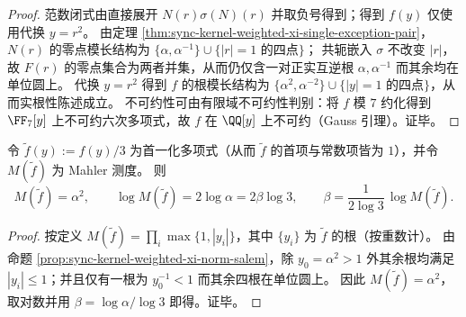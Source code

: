 \begin{proof}
范数闭式由直接展开 \(N(r)\sigma(N)(r)\) 并取负号得到；得到 \(f(y)\) 仅使用代换 \(y=r^2\)。
由定理 \ref{thm:sync-kernel-weighted-xi-single-exception-pair}，\(N(r)\) 的零点模长结构为 \(\{\alpha,\alpha^{-1}\}\cup\{|r|=1\text{ 的四点}\}\)；
共轭嵌入 \(\sigma\) 不改变 \(|r|\)，故 \(F(r)\) 的零点集合为两者并集，从而仍仅含一对正实互逆根 \(\alpha,\alpha^{-1}\) 而其余均在单位圆上。
代换 \(y=r^2\) 得到 \(f\) 的根模长结构为 \(\{\alpha^2,\alpha^{-2}\}\cup\{|y|=1\text{ 的四点}\}\)，从而实根性陈述成立。
不可约性可由有限域不可约性判别：将 \(f\) 模 \(7\) 约化得到 \(\FF_7[y]\) 上不可约六次多项式，故 \(f\) 在 \(\QQ[y]\) 上不可约（Gauss 引理）。证毕。
\end{proof}

\begin{theorem}\label{thm:sync-kernel-weighted-xi-beta-mahler}
令 \(\tilde f(y):=f(y)/3\) 为首一化多项式（从而 \(\tilde f\) 的首项与常数项皆为 \(1\)），并令 \(M(\tilde f)\) 为 Mahler 测度。
则
\[
M(\tilde f)=\alpha^2,
\qquad
\log M(\tilde f)=2\log\alpha=2\beta\log 3,
\qquad
\beta=\frac{1}{2\log 3}\,\log M(\tilde f).
\]
\end{theorem}

\begin{proof}
按定义 \(M(\tilde f)=\prod_i\max\{1,|y_i|\}\)，其中 \(\{y_i\}\) 为 \(\tilde f\) 的根（按重数计）。
由命题 \ref{prop:sync-kernel-weighted-xi-norm-salem}，除 \(y_0=\alpha^2>1\) 外其余根均满足 \(|y_i|\le 1\)；并且仅有一根为 \(y_0^{-1}<1\) 而其余四根在单位圆上。
因此 \(M(\tilde f)=\alpha^2\)，取对数并用 \(\beta=\log\alpha/\log 3\) 即得。证毕。
\end{proof}
